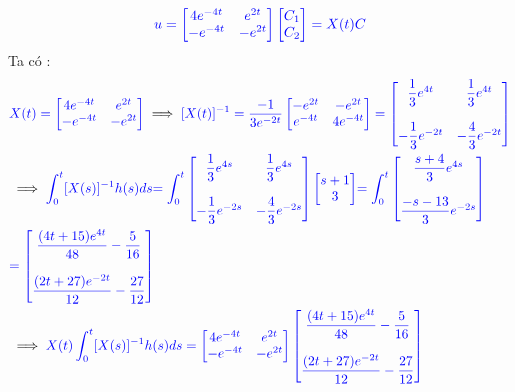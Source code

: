 \documentclass[a4paper]{article}
\begin{document}
\begin{align}
\notag
\textcolor{blue}{u= \begin{bmatrix} 4e^{-4t} & e^{2t}\\ -e^{-4t} & -e^{2t} \end{bmatrix} \begin{bmatrix} C_1 \\ C_2 \end{bmatrix}=X(t)C}
\end{align}
Ta có :  
\begin{align*}
\notag
&\textcolor{blue}{X(t)=  \begin{bmatrix} 4e^{-4t} & e^{2t}\\ -e^{-4t} & -e^{2t} \end{bmatrix}} \implies \textcolor{blue}{[X(t)]^{-1}= \dfrac{-1}{3e^{-2t}} \begin{bmatrix} -e^{2t} & -e^{2t}\\ e^{-4t} & 4e^{-4t} \end{bmatrix}= \begin{bmatrix} 
 \dfrac{1}{3}e^{4t} & \dfrac{1}{3}e^{4t} \\\\ -\dfrac{1}{3}e^{-2t} & -\dfrac{4}{3}e^{-2t} \end{bmatrix} }\\
&\implies  \textcolor{blue}
{\int_{0}^{t}[X(s)]^{-1}h(s) ds }\textcolor{blue}{=\int_{0}^{t}\begin{bmatrix} 
 \dfrac{1}{3}e^{4s} & \dfrac{1}{3}e^{4s} \\\\ -\dfrac{1}{3}e^{-2s} & -\dfrac{4}{3}e^{-2s} \end{bmatrix} \begin{bmatrix} s+1 \\ 3 \end{bmatrix}}
 \textcolor{blue}{= \int_{0}^{t}\begin{bmatrix}  \dfrac{s+4}{3}e^{4s} \\\\  \dfrac{-s-13}{3}e^{-2s} \end{bmatrix}}\\
 &\textcolor{blue}{= \begin{bmatrix} \dfrac{(4t+15)e^{4t}}{48} -\dfrac{5}{16}\\\\ \dfrac{(2t+27)e^{-2t}}{12} -\dfrac{27}{12}\end{bmatrix}} 
 \\ &\implies \textcolor{blue}
{X(t)\int_{0}^{t}[X(s)]^{-1}h(s) ds =\begin{bmatrix} 4e^{-4t} & e^{2t}\\ -e^{-4t} & -e^{2t} \end{bmatrix}\begin{bmatrix} \dfrac{(4t+15)e^{4t}}{48} -\dfrac{5}{16}\\\\ \dfrac{(2t+27)e^{-2t}}{12} -\dfrac{27}{12}\end{bmatrix}}\\

\end{align*}
\end{document}
